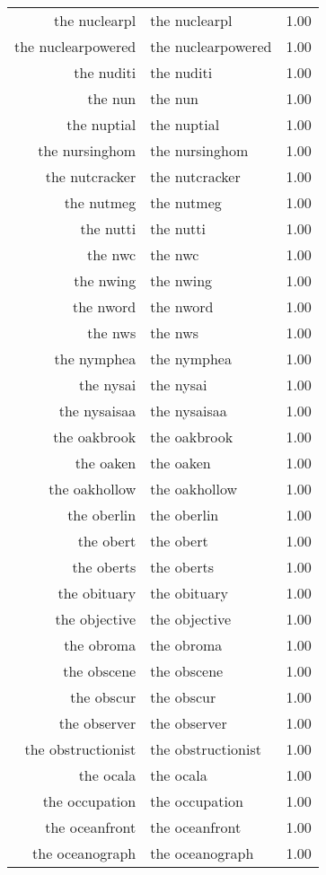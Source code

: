 \begin{table}[ht]
\begin{tabular}{rlr}
  the nuclearpl & the nuclearpl & 1.00 \\ 
  the nuclearpowered & the nuclearpowered & 1.00 \\ 
  the nuditi & the nuditi & 1.00 \\ 
  the nun & the nun & 1.00 \\ 
  the nuptial & the nuptial & 1.00 \\ 
  the nursinghom & the nursinghom & 1.00 \\ 
  the nutcracker & the nutcracker & 1.00 \\ 
  the nutmeg & the nutmeg & 1.00 \\ 
  the nutti & the nutti & 1.00 \\ 
  the nwc & the nwc & 1.00 \\ 
  the nwing & the nwing & 1.00 \\ 
  the nword & the nword & 1.00 \\ 
  the nws & the nws & 1.00 \\ 
  the nymphea & the nymphea & 1.00 \\ 
  the nysai & the nysai & 1.00 \\ 
  the nysaisaa & the nysaisaa & 1.00 \\ 
  the oakbrook & the oakbrook & 1.00 \\ 
  the oaken & the oaken & 1.00 \\ 
  the oakhollow & the oakhollow & 1.00 \\ 
  the oberlin & the oberlin & 1.00 \\ 
  the obert & the obert & 1.00 \\ 
  the oberts & the oberts & 1.00 \\ 
  the obituary & the obituary & 1.00 \\ 
  the objective & the objective & 1.00 \\ 
  the obroma & the obroma & 1.00 \\ 
  the obscene & the obscene & 1.00 \\ 
  the obscur & the obscur & 1.00 \\ 
  the observer & the observer & 1.00 \\ 
  the obstructionist & the obstructionist & 1.00 \\ 
  the ocala & the ocala & 1.00 \\ 
  the occupation & the occupation & 1.00 \\ 
  the oceanfront & the oceanfront & 1.00 \\ 
  the oceanograph & the oceanograph & 1.00 \\ 

\end{tabular}
\end{table}
